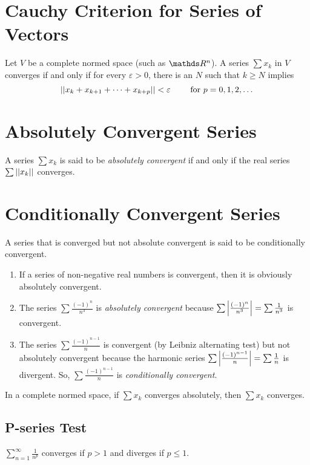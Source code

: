 \documentclass[../main-sheet.tex]{subfiles}
\begin{document}
\section{Cauchy Criterion for Series of Vectors}
Let $ V $ be a complete normed space (such as $ \R^n $). A series $ \sum x_k $ in $ V $ converges if and only if for every $ \varepsilon >0 $, there is an $ N $ such that $ k\geq N $ implies
\[
    \left\vert\left\vert x_k+x_{k+1}+\dots+x_{k+p}\right\vert\right\vert<\varepsilon \qquad \text{ for } p=0,1,2,\dots
\]
\section{Absolutely Convergent Series}
A series $ \sum x_k $ is said to be \emph{absolutely convergent} if and only if the real series $ \sum \left\vert\left\vert x_k\right\vert\right\vert $ converges.

\section{Conditionally Convergent Series}
A series that is converged but not absolute convergent is said to be conditionally convergent.
\begin{ex}
    \hfill
    \begin{enumerate}
        \item If a series of non-negative real numbers is convergent, then it is obviously absolutely convergent.
        \item The series $ \sum \frac{(-1)^n}{n^3} $ is \emph{absolutely convergent} because $ \sum \left\vert\frac{(-1)^n}{n^3}\right\vert=\sum \frac{1}{n^3} $ is convergent.
        \item The series $ \sum \frac{(-1)^{n-1}}{n} $ is convergent (by Leibniz alternating test) but not absolutely convergent because the harmonic series $ \sum \left\vert\frac{(-1)^{n-1}}{n}\right\vert=\sum \frac{1}{n}  $ is divergent. So,  $ \sum \frac{(-1)^{n-1}}{n} $ is \emph{conditionally convergent}.
    \end{enumerate}
\end{ex}
\begin{thm}
    In a complete normed space, if $ \sum x_k $ converges absolutely, then $ \sum x_k $ converges.
\end{thm}
\subsection{P-series Test}
$ \sum_{n=1}^\infty \frac{1}{n^p} $ converges if $ p>1 $ and diverges if $ p\leq 1 $.
\end{document}
